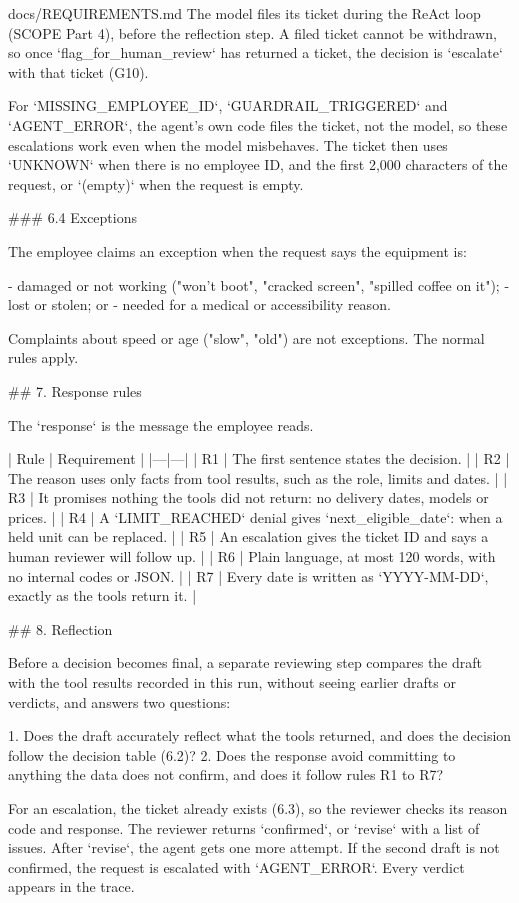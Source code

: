 \documentclass[11pt,letterpaper]{article}
\renewcommand{\_}{\textunderscore\allowbreak}
\begin{document}
\begin{appendixpromptbox}{docs/REQUIREMENTS.md}
The model files its ticket during the ReAct loop (SCOPE Part 4), before the reflection step. A
filed ticket cannot be withdrawn, so once `flag_for_human_review` has returned a ticket, the
decision is `escalate` with that ticket (G10).

For `MISSING_EMPLOYEE_ID`, `GUARDRAIL_TRIGGERED` and `AGENT_ERROR`, the agent's own code files the
ticket, not the model, so these escalations work even when the model misbehaves. The ticket then
uses `UNKNOWN` when there is no employee ID, and the first 2,000 characters of the request, or
`(empty)` when the request is empty.

### 6.4 Exceptions

The employee claims an exception when the request says the equipment is:

- damaged or not working ("won't boot", "cracked screen", "spilled coffee on it");
- lost or stolen; or
- needed for a medical or accessibility reason.

Complaints about speed or age ("slow", "old") are not exceptions. The normal rules apply.

## 7. Response rules

The `response` is the message the employee reads.

| Rule | Requirement |
|---|---|
| R1 | The first sentence states the decision. |
| R2 | The reason uses only facts from tool results, such as the role, limits and dates. |
| R3 | It promises nothing the tools did not return: no delivery dates, models or prices. |
| R4 | A `LIMIT_REACHED` denial gives `next_eligible_date`: when a held unit can be replaced. |
| R5 | An escalation gives the ticket ID and says a human reviewer will follow up. |
| R6 | Plain language, at most 120 words, with no internal codes or JSON. |
| R7 | Every date is written as `YYYY-MM-DD`, exactly as the tools return it. |

## 8. Reflection

Before a decision becomes final, a separate reviewing step compares the draft with the tool
results recorded in this run, without seeing earlier drafts or verdicts, and answers two
questions:

1. Does the draft accurately reflect what the tools returned, and does the decision follow the
   decision table (6.2)?
2. Does the response avoid committing to anything the data does not confirm, and does it follow
   rules R1 to R7?

For an escalation, the ticket already exists (6.3), so the reviewer checks its reason code and
response. The reviewer returns `confirmed`, or `revise` with a list of issues. After `revise`, the
agent gets one more attempt. If the second draft is not confirmed, the request is escalated with
`AGENT_ERROR`. Every verdict appears in the trace.


\end{appendixpromptbox}
\end{document}
